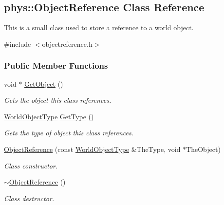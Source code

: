 \hypertarget{classphys_1_1ObjectReference}{
\subsection{phys::ObjectReference Class Reference}
\label{classphys_1_1ObjectReference}
}


This is a small class used to store a reference to a world object.  




{\ttfamily \#include $<$objectreference.h$>$}

\subsubsection*{Public Member Functions}
\begin{DoxyCompactItemize}
\item 
void $\ast$ \hyperlink{classphys_1_1ObjectReference_a729c6e6b0ec5f0bbc7eb19987235729e}{GetObject} ()
\begin{DoxyCompactList}\small\item\em Gets the object this class references. \item\end{DoxyCompactList}\item 
\hyperlink{namespacephys_a56410935e1c614a932dbc91ee7330df1}{WorldObjectType} \hyperlink{classphys_1_1ObjectReference_aea70ac457331e5b20a7487e2d93ba005}{GetType} ()
\begin{DoxyCompactList}\small\item\em Gets the type of object this class references. \item\end{DoxyCompactList}\item 
\hyperlink{classphys_1_1ObjectReference_aa97733aef863b81f9fdbb4455d60d7e9}{ObjectReference} (const \hyperlink{namespacephys_a56410935e1c614a932dbc91ee7330df1}{WorldObjectType} \&TheType, void $\ast$TheObject)
\begin{DoxyCompactList}\small\item\em Class constructor. \item\end{DoxyCompactList}\item 
\hypertarget{classphys_1_1ObjectReference_ae0205396bc65406316730a6cd5bdc237}{
\hyperlink{classphys_1_1ObjectReference_ae0205396bc65406316730a6cd5bdc237}{$\sim$ObjectReference} ()}
\label{classphys_1_1ObjectReference_ae0205396bc65406316730a6cd5bdc237}

\begin{DoxyCompactList}\small\item\em Class destructor. \item\end{DoxyCompactList}\end{DoxyCompactItemize}
